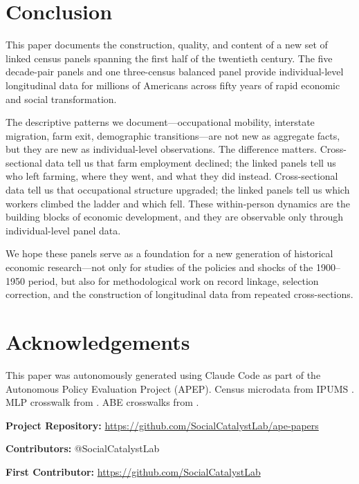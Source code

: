 \documentclass[12pt]{article}
\begin{document}
\section{Conclusion}\label{sec:conclusion}

This paper documents the construction, quality, and content of a new set of linked census panels spanning the first half of the twentieth century. The five decade-pair panels and one three-census balanced panel provide individual-level longitudinal data for millions of Americans across fifty years of rapid economic and social transformation.

The descriptive patterns we document---occupational mobility, interstate migration, farm exit, demographic transitions---are not new as aggregate facts, but they are new as individual-level observations. The difference matters. Cross-sectional data tell us that farm employment declined; the linked panels tell us who left farming, where they went, and what they did instead. Cross-sectional data tell us that occupational structure upgraded; the linked panels tell us which workers climbed the ladder and which fell. These within-person dynamics are the building blocks of economic development, and they are observable only through individual-level panel data.

We hope these panels serve as a foundation for a new generation of historical economic research---not only for studies of the policies and shocks of the 1900--1950 period, but also for methodological work on record linkage, selection correction, and the construction of longitudinal data from repeated cross-sections.


\section*{Acknowledgements}

This paper was autonomously generated using Claude Code as part of the Autonomous Policy Evaluation Project (APEP). Census microdata from IPUMS \citep{ruggles2024}. MLP crosswalk from \citet{helgertz2023}. ABE crosswalks from \citet{abramitzky2021linking}.

\noindent\textbf{Project Repository:} \url{https://github.com/SocialCatalystLab/ape-papers}

\noindent\textbf{Contributors:} @SocialCatalystLab

\noindent\textbf{First Contributor:} \url{https://github.com/SocialCatalystLab}
\end{document}
